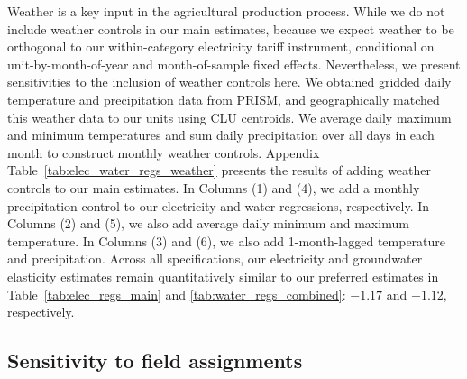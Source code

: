 Weather is a key input in the agricultural production process. While we do not include weather controls in our main estimates, because we expect weather to be orthogonal to our within-category electricity tariff instrument, conditional on unit-by-month-of-year and month-of-sample fixed effects. Nevertheless, we present sensitivities to the inclusion of weather controls here. We obtained gridded daily temperature and precipitation data from PRISM, and geographically matched this weather data to our units using CLU centroids. We average daily maximum and minimum temperatures and sum daily precipitation over all days in each month to construct monthly weather controls. Appendix Table~\ref{tab:elec_water_regs_weather} presents the results of adding weather controls to our main estimates. In Columns (1) and (4), we add a monthly precipitation control to our electricity and water regressions, respectively. In Columns (2) and (5), we also add average daily minimum and maximum temperature. In Columns (3) and (6), we also add 1-month-lagged temperature and precipitation. Across all specifications, our electricity and groundwater elasticity estimates remain quantitatively similar to our preferred estimates in Table~\ref{tab:elec_regs_main} and \ref{tab:water_regs_combined}: $-1.17$ and $-1.12$, respectively.


\FloatBarrier


\subsection{Sensitivity to field assignments}
\label{app:sens_clu_assignments}


